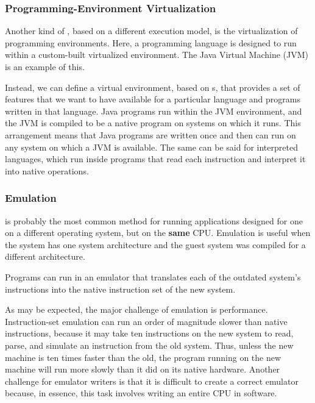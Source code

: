 \subsubsection{Programming-Environment Virtualization}\label{subsubsec:Programming_Lang_Virtualization}
Another kind of , based on a different execution model, is the virtualization of programming environments.
Here, a programming language is designed to run within a custom-built virtualized environment.
The Java Virtual Machine (JVM) is an example of this.

Instead, we can define a virtual environment, based on s, that provides a set of features that we want to have available for a particular language and programs written in that language.
Java programs run within the JVM environment, and the JVM is compiled to be a native program on systems on which it runs.
This arrangement means that Java programs are written once and then can run on any system on which a JVM is available.
The same can be said for interpreted languages, which run inside programs that read each instruction and interpret it into native operations.

\subsubsection{Emulation}\label{subsubsec:Emulation}
 is probably the most common method for running applications designed for one  on a different operating system, but on the \textbf{same} CPU.\@
Emulation is useful when the  system has one system architecture and the guest system was compiled for a different architecture.

Programs can run in an emulator that translates each of the outdated system's instructions into the native instruction set of the new system.

As may be expected, the major challenge of emulation is performance.
Instruction-set emulation can run an order of magnitude slower than native instructions, because it may take ten instructions on the new system to read, parse, and simulate an instruction from the old system.
Thus, unless the new machine is ten times faster than the old, the program running on the new machine will run more slowly than it did on its native hardware.
Another challenge for emulator writers is that it is difficult to create a correct emulator because, in essence, this task involves writing an entire CPU in software.


